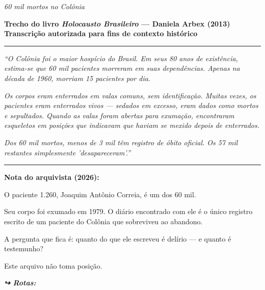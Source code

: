 
\noindent \textit{60 mil mortos no Colônia}

\noindent \textbf{Trecho do livro \textit{Holocausto Brasileiro} --- Daniela Arbex (2013)}
\textbf{Transcrição autorizada para fins de contexto histórico}

\vspace{0.5em}\noindent\rule{\textwidth}{0.5pt}\vspace{0.5em}

\noindent \textit{\textquotedblleft{}O Colônia foi o maior hospício do Brasil. Em seus 80 anos de existência, estima-se que 60 mil pacientes morreram em suas dependências. Apenas na década de 1960, morriam 15 pacientes por dia.}

\noindent \textit{Os corpos eram enterrados em valas comuns, sem identificação. Muitas vezes, os pacientes eram enterrados vivos --- sedados em excesso, eram dados como mortos e sepultados. Quando as valas foram abertas para exumação, encontraram esqueletos em posições que indicavam que haviam se mexido depois de enterrados.}

\noindent \textit{Dos 60 mil mortos, menos de 3 mil têm registro de óbito oficial. Os 57 mil restantes simplesmente 'desapareceram'.\textquotedblright{}}

\vspace{0.5em}\noindent\rule{\textwidth}{0.5pt}\vspace{0.5em}

\noindent \textbf{Nota do arquivista (2026):}

\noindent O paciente 1.260, Joaquim Antônio Correia, é um dos 60 mil.

\noindent Seu corpo foi exumado em 1979. O diário encontrado com ele é o único registro escrito de um paciente do Colônia que sobreviveu ao abandono.

\noindent A pergunta que fica é: quanto do que ele escreveu é delírio --- e quanto é testemunho?

\noindent Este arquivo não toma posição.

\vspace{0.5em}
\noindent\textit{\textbf{↪ Rotas:}  \rotasep {} \rotasep {}}